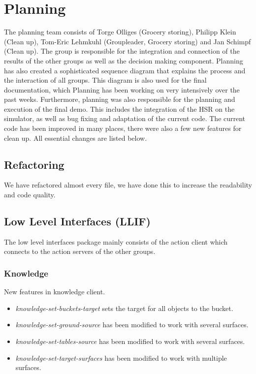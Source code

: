 \documentclass[main.tex]{subfiles}
\begin{document}
	
	\chapter{Planning}
                The planning team consists of Torge Olliges (Grocery storing), Philipp Klein (Clean up), Tom-Eric Lehmkuhl (Groupleader, Grocery storing) and Jan Schimpf (Clean up). The group is responsible for the integration and connection of the results of the other groups as well as the decision making component. Planning has also created a sophisticated sequence diagram that explains the process and the interaction of all groups. This diagram is also used for the final documentation, which Planning has been working on very intensively over the past weeks. Furthermore, planning was also responsible for the planning and execution of the final demo. This includes the integration of the HSR on the simulator, as well as bug fixing and adaptation of the current code. The current code has been improved in many places, there were also a few new features for clean up. All essential changes are listed below. 
          
          		\section{Refactoring}
	        	    We have refactored almost every file, we have done this to increase the readability and code quality.   
	        	    
	        	\section{Low Level Interfaces (LLIF)}
	                The low level interfaces package mainly consists of the action client which connects to the action servers of the other groups.
                
                \subsection{Knowledge}
	                New features in knowledge client.
				    \begin{itemize}
				      \item \textit{knowledge-set-buckets-target} sets the target for all objects to the bucket.
				       \item \textit{knowledge-set-ground-source} has been modified to work with several surfaces. 
				       \item \textit{knowledge-set-tables-source} has been modified to work with several surfaces. 
				       \item \textit{knowledge-set-target-surfaces} has been modified to work with multiple surfaces.
		
				    \end{itemize} 
                                           
\end{document}
